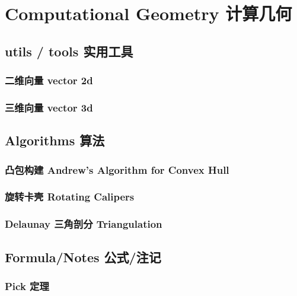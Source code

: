 
\section{Computational Geometry 计算几何}

\subsection{utils / tools 实用工具}

\subsubsection{二维向量 vector 2d}


\subsubsection{三维向量 vector 3d}


\subsection{Algorithms 算法}

\subsubsection{凸包构建 Andrew's Algorithm for Convex Hull}


\subsubsection{旋转卡壳 Rotating Calipers}


\subsubsection{Delaunay 三角剖分 Triangulation}


\subsection{Formula/Notes 公式/注记}

\subsubsection{Pick 定理}

